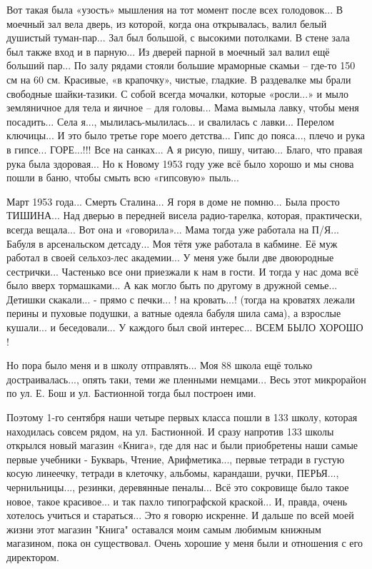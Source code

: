 Вот такая была «узость» мышления на тот момент после всех голодовок... В моечный
зал вела дверь, из которой, когда она открывалась, валил белый душистый
туман-пар... Зал был большой, с высокими потолками. В стене зала был также вход и
в парную... Из дверей парной в моечный зал валил ещё больший пар... По залу
рядами стояли большие мраморные скамьи – где-то 150 см на 60 см. Красивые, «в
крапочку», чистые, гладкие. В раздевалке мы брали свободные шайки-тазики. С
собой всегда мочалки, которые «росли...» и мыло земляничное для тела и яичное –
для головы... Мама вымыла лавку, чтобы меня посадить... Села я..., мылилась-мылилась...
и свалилась с лавки... Перелом ключицы... И это было третье горе моего детства...
Гипс до пояса..., плечо и рука в гипсе... ГОРЕ...!!! Все на санках... А я рисую, пишу,
читаю... Благо, что правая рука была здоровая... Но к Новому 1953 году уже всё было
хорошо и мы снова пошли в баню, чтобы смыть всю «гипсовую» пыль...

Март 1953 года... Смерть Сталина... Я горя в доме не помню... Была просто ТИШИНА...
Над дверью в передней висела радио-тарелка, которая, практически, всегда
вещала... Вот она и «говорила»... Мама тогда уже работала на П/Я... Бабуля в
арсенальском детсаду... Моя тётя уже работала в кабмине. Её муж работал в своей
сельхоз-лес академии... У меня уже были две двоюродные сестрички... Частенько все
они приезжали к нам в гости. И тогда у нас дома всё было вверх тормашками... А
как могло быть по другому в дружной семье... Детишки скакали... - прямо с печки...
! на кровать...! (тогда на кроватях лежали перины и пуховые подушки, а ватные
одеяла бабуля шила сама), а взрослые кушали... и беседовали... У каждого был
свой интерес... ВСЕМ БЫЛО ХОРОШО !

Но пора было меня и в школу отправлять... Моя 88 школа ещё только
достраивалась..., опять таки, теми же пленными немцами... Весь этот микрорайон по
ул. Е. Бош и ул. Бастионной тогда был построен ими.

Поэтому 1-го сентября наши четыре первых класса пошли в 133 школу, которая
находилась совсем рядом, на ул. Бастионной. И сразу напротив 133 школы открылся
новый магазин «Книга», где для нас и были приобретены наши самые первые
учебники - Букварь, Чтение, Арифметика..., первые тетради в густую косую
линеечку, тетради в клеточку, альбомы, карандаши, ручки, ПЕРЬЯ..., чернильницы...,
резинки, деревянные пеналы... Всё это сокровище было такое новое, такое красивое...
и так пахло типографской краской... И, правда, очень хотелось учиться и
стараться... Это я говорю искренне. И дальше по всей моей жизни этот магазин
"Книга" оставался моим самым любимым книжным магазином, пока он существовал.
Очень хорошие у меня были и отношения с его директором. 

